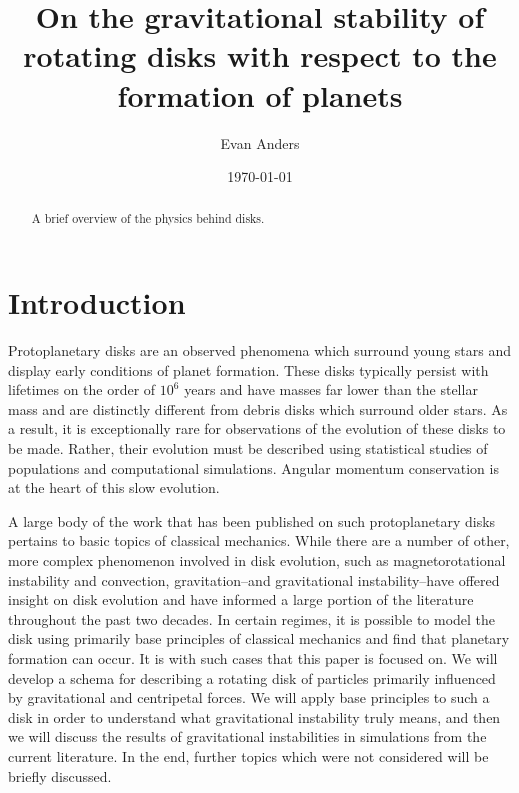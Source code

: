 \documentclass[aps,pra,twocolumn]{revtex4-1}
\begin{document}
\title{On the gravitational stability of rotating disks with respect to the formation of planets}

\author{Evan Anders}


\date{\today}

\begin{abstract}
A brief overview of the physics behind disks.
\end{abstract}



\maketitle


\section{\label{section1} Introduction}

Protoplanetary disks are an observed phenomena which surround young stars and display early conditions of planet formation.  These disks typically persist with lifetimes on the order of $10^6$ years and have masses far lower than the stellar mass and are distinctly different from debris disks which surround older stars.  As a result, it is exceptionally rare for observations of the evolution of these disks to be made.  Rather, their evolution must be described using statistical studies of populations and computational simulations.  Angular momentum conservation is at the heart of this slow evolution.   \cite{armitage2011}

A large body of the work that has been published on such protoplanetary disks pertains to basic topics of classical mechanics.  While there are a number of other, more complex phenomenon involved in disk evolution, such as magnetorotational instability and convection, gravitation--and gravitational instability--have offered insight on disk evolution and have informed a large portion of the literature throughout the past two decades.  In certain regimes, it is possible to model the disk using primarily base principles of classical mechanics and find that planetary formation can occur.  It is with such cases that this paper is focused on.  We will develop a schema for describing a rotating disk of particles primarily influenced by gravitational and centripetal forces.  We will apply base principles to such a disk in order to understand what gravitational instability truly means, and then we will discuss the results of gravitational instabilities in simulations from the current literature.  In the end, further topics which were not considered will be briefly discussed.
\end{document}
